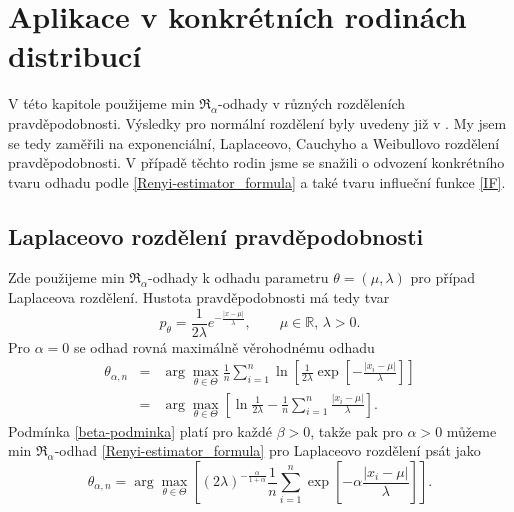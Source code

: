 
\chapter{Aplikace v konkrétních rodinách distribucí}

V této kapitole použijeme min $\mathfrak{R}_\alpha$-odhady v různých rozděleních pravděpodobnosti. Výsledky pro normální rozdělení byly uvedeny již v \cite{Demut2010}. My jsem se tedy zaměřili na exponenciální, Laplaceovo, Cauchyho a Weibullovo rozdělení pravděpodobnosti. V případě těchto rodin jsme se snažili o odvození konkrétního tvaru odhadu podle \eqref{Renyi-estimator_formula} a také tvaru influeční funkce \eqref{IF}.

\section{Laplaceovo rozdělení pravděpodobnosti}

Zde použijeme min $\mathfrak{R}_\alpha$-odhady k odhadu parametru $\theta = (\mu,\lambda)$ pro případ Laplaceova rozdělení. Hustota pravděpodobnosti má tedy tvar
\begin{equation}
	p_\theta = \frac{1}{2\lambda} e^{-\frac{|x-\mu|}{\lambda}}, \qquad \mu\in \mathbb{R},\, \lambda>0.
\end{equation}
Pro $\alpha = 0$ se odhad rovná maximálně věrohodnému odhadu 
\begin{eqnarray}
	\theta_{\alpha,n} & = & \arg \max_{\theta \in \Theta} \frac{1}{n} \sum^n_{i=1} \ln \left[ \frac{1}{2\lambda}\exp \left[-\frac{|x_i-\mu|}{\lambda} \right] \right] \nonumber \\
	& = & \arg \max_{\theta \in \Theta} \left[ \ln \frac{1}{2\lambda} - \frac{1}{n} \sum^n_{i=1} \frac{|x_i-\mu|}{\lambda} \right].
\end{eqnarray}
Podmínka \eqref{beta-podminka} platí pro každé $\beta>0$, takže pak pro $\alpha>0$ můžeme  min $\mathfrak{R}_\alpha$-odhad \eqref{Renyi-estimator_formula} pro Laplaceovo rozdělení psát jako 
\begin{equation}
	\theta_{\alpha,n} = \arg \max_{\theta \in \Theta} \left[ (2\lambda)^{-\frac{\alpha}{1+\alpha}} \frac{1}{n} \sum_{i=1}^n \exp \left[-\alpha\frac{|x_i-\mu|}{\lambda} \right] \right].
\end{equation}


